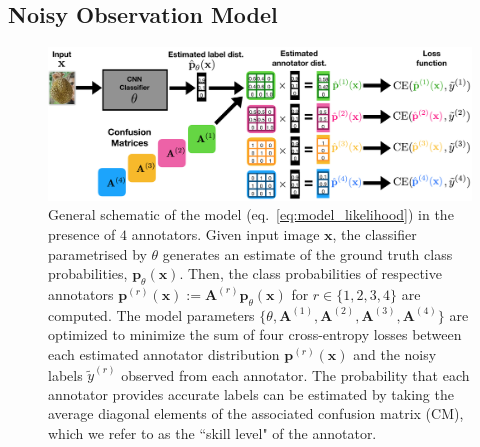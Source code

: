 
\subsection{Noisy Observation Model}
\begin{figure}[ht]
	\center
	\includegraphics[width=\linewidth]{chapter_4/figures/model_schematic_2.png}
	\small
	\caption{\small General schematic of the model (eq.~\ref{eq:model_likelihood}) in the presence of $4$ annotators. Given input image $\mathbf{x}$, the classifier parametrised by $\theta$ generates an estimate of the ground truth class probabilities, $\mathbf{p}_{\theta}(\mathbf{x})$. Then, the class probabilities of respective annotators $\mathbf{p}^{(r)}(\mathbf{x}):= \mathbf{A}^{(r)}\mathbf{p}_{\theta}(\mathbf{x})$ for $r\in \{1,2,3,4\}$ are computed. The model parameters $\{\theta, \mathbf{A}^{(1)}, \mathbf{A}^{(2)}, \mathbf{A}^{(3)}, \mathbf{A}^{(4)}\}$ are optimized to minimize the sum of four cross-entropy losses between each estimated annotator distribution $\textbf{p}^{(r)}(\mathbf{x})$ and the noisy labels $\tilde{y}^{(r)}$ observed from each annotator. The probability that each annotator provides accurate labels can be estimated by taking the average diagonal elements of the associated confusion matrix (CM), which we refer to as the ``skill level" of the annotator.}
    \label{fig:schematic}
    \vspace{-4mm}
\end{figure}

